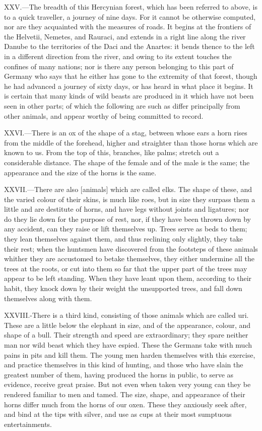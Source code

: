 XXV.—The breadth of this Hercynian forest, which has been referred to
above, is to a quick traveller, a journey of nine days. For it cannot be
otherwise computed, nor are they acquainted with the measures of roads.
It begins at the frontiers of the Helvetii, Nemetes, and Rauraci, and
extends in a right line along the river Danube to the territories of the
Daci and the Anartes: it bends thence to the left in a different
direction from the river, and owing to its extent touches the confines
of many nations; nor is there any person belonging to this part of
Germany who says that he either has gone to the extremity of that
forest, though he had advanced a journey of sixty days, or has heard in
what place it begins. It is certain that many kinds of wild beasts are
produced in it which have not been seen in other parts; of which the
following are such as differ principally from other animals, and appear
worthy of being committed to record.

XXVI.—There is an ox of the shape of a stag, between whose ears a horn
rises from the middle of the forehead, higher and straighter than those
horns which are known to us. From the top of this, branches, like palms;
stretch out a considerable distance. The shape of the female and of the
male is the same; the appearance and the size of the horns is the same.

XXVII.—There are also [animals] which are called elks. The shape of
these, and the varied colour of their skins, is much like roes, but in
size they surpass them a little and are destitute of horns, and have
legs without joints and ligatures; nor do they lie down for the purpose
of rest, nor, if they have been thrown down by any accident, can they
raise or lift themselves up. Trees serve as beds to them; they lean
themselves against them, and thus reclining only slightly, they take
their rest; when the huntsmen have discovered from the footsteps of
these animals whither they are accustomed to betake themselves, they
either undermine all the trees at the roots, or cut into them so far
that the upper part of the trees may appear to be left standing. When
they have leant upon them, according to their habit, they knock down by
their weight the unsupported trees, and fall down themselves along with
them.

XXVIII.-There is a third kind, consisting of those animals which are
called uri. These are a little below the elephant in size, and of the
appearance, colour, and shape of a bull. Their strength and speed are
extraordinary; they spare neither man nor wild beast which they have
espied. These the Germans take with much pains in pits and kill them.
The young men harden themselves with this exercise, and practice
themselves in this kind of hunting, and those who have slain the
greatest number of them, having produced the horns in public, to serve
as evidence, receive great praise. But not even when taken very young
can they be rendered familiar to men and tamed. The size, shape, and
appearance of their horns differ much from the horns of our oxen. These
they anxiously seek after, and bind at the tips with silver, and use as
cups at their most sumptuous entertainments.

